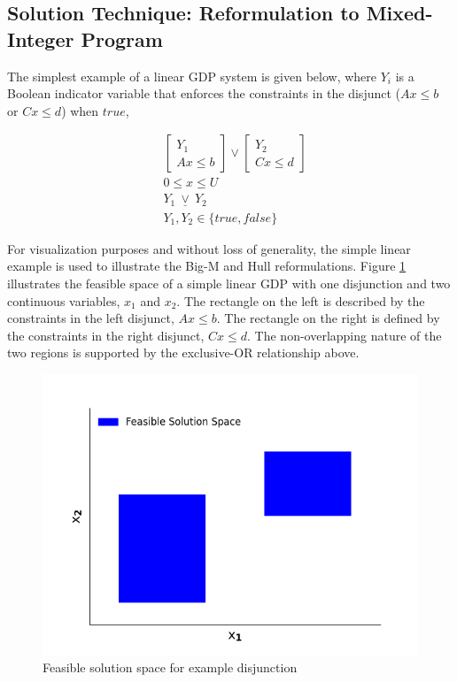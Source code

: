 \documentclass{juliacon}
\begin{document}
\subsection{Solution Technique: Reformulation to Mixed-Integer Program} \label{reformulation}
The simplest example of a linear GDP system is given below, where $Y_i$ is a Boolean indicator variable that enforces the constraints in the disjunct ($Ax \le b$ or $Cx \le d$) when $true$,

\begin{align*}
    & \begin{bmatrix}
    Y_1 \\ Ax \leq b
    \end{bmatrix}
    \lor
    \begin{bmatrix}
        Y_2 \\ Cx \leq d
    \end{bmatrix} \\
    & 0 \leq x \leq U \\
    & Y_1 \ \underline{\vee} \ Y_2 \\
    & Y_1, Y_2 \in \{true, false\}
\end{align*}

For visualization purposes and without loss of generality, the simple linear example is used to illustrate the Big-M and Hull reformulations. Figure \ref{fig:reform_figure} illustrates the feasible space of a simple linear GDP with one disjunction and two continuous variables, $x_1$ and $x_2$. The rectangle on the left is described by the constraints in the left disjunct, $Ax \leq b$. The rectangle on the right is defined by the constraints in the right disjunct, $Cx \le d$. The non-overlapping nature of the two regions is supported by the exclusive-OR relationship above.

\begin{figure}
    \centering
    \includegraphics[scale=0.5]{solnspace.png}
    \caption{Feasible solution space for example disjunction}
    \label{fig:reform_figure}
\end{figure}
\end{document}
